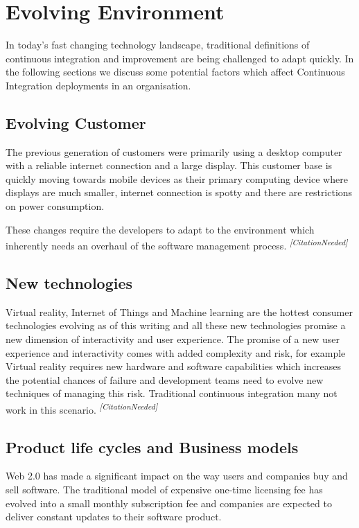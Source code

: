 \documentclass[12pt,conference]{IEEEtran}
\newcommand{\citationneeded}{\textsuperscript{\textit{[CitationNeeded]}}}
\begin{document}
\section*{Evolving Environment}

In today's fast changing technology landscape, traditional definitions of continuous integration and improvement are being challenged to adapt quickly. In the following sections we discuss some potential factors which affect Continuous Integration deployments in an organisation.

\subsection*{Evolving Customer}
The previous generation of customers were primarily using a desktop computer with a reliable internet connection and a large display. This customer base is quickly moving towards mobile devices as their primary computing device where displays are much smaller, internet connection is spotty and there are restrictions on power consumption. 

These changes require the developers to adapt to the environment which inherently needs an overhaul of the software management process. \citationneeded


\subsection*{New technologies}

Virtual reality, Internet of Things and Machine learning are the hottest consumer technologies evolving as of this writing and all these new technologies promise a new dimension of interactivity and user experience. The promise of a new user experience and interactivity comes with added complexity and risk, for example Virtual reality requires new hardware and software capabilities which increases the potential chances of failure and development teams need to evolve new techniques of managing this risk. Traditional continuous integration many not work in this scenario. \citationneeded

\subsection*{Product life cycles and Business models}

Web 2.0 has made a significant impact on the way users and companies buy and sell software. The traditional model of expensive one-time licensing fee has evolved into a small monthly subscription fee and companies are expected to deliver constant updates to their software product. 
\end{document}
